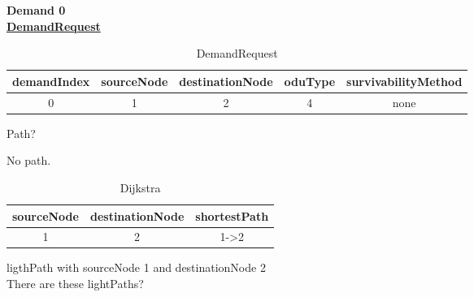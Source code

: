 \textbf{Demand 0}\\

\underline{\textbf{DemandRequest}}

\begin{table}[H]
	\centering
	\begin{tabular}{| c | c | c | c | c |}
		\hline
		\textbf{demandIndex} & \textbf{sourceNode} & \textbf{destinationNode} & \textbf{oduType} & \textbf{survivabilityMethod}\\ \hline
		0                    & 1                   & 2                        & 4                & none						   \\ \hline
	\end{tabular}
	\caption{DemandRequest}
	\label{demand_request}
\end{table}

Path?

\begin{table}[H]
	\centering
	\caption{paths}
	\label{paths}
\end{table}

No path.

\begin{table}[H]
	\centering
	\begin{tabular}{| c | c | c |}
		\hline
		\textbf{sourceNode} & \textbf{destinationNode} & \textbf{shortestPath}       \\ \hline
		1				    & 2                        & 1->2                      \\ \hline
	\end{tabular}               
	\caption{Dijkstra}
	\label{dijkstra}
\end{table}

ligthPath with sourceNode 1 and destinationNode 2\\ 

There are these lightPaths?

